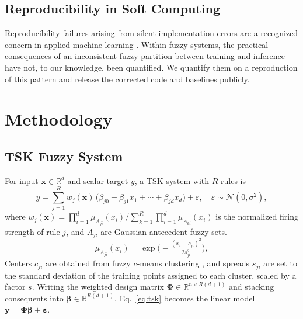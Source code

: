 \documentclass[review,1p,times]{elsarticle}
\begin{document}
\subsection{Reproducibility in Soft Computing}

Reproducibility failures arising from silent implementation errors are a recognized concern in applied machine learning \cite{pineau2021improving}. Within fuzzy systems, the practical consequences of an inconsistent fuzzy partition between training and inference have not, to our knowledge, been quantified. We quantify them on a reproduction of this pattern and release the corrected code and baselines publicly.

\section{Methodology}
\label{sec:method}

\subsection{TSK Fuzzy System}
\label{sec:tsk}

For input $\mathbf{x}\in\mathbb{R}^d$ and scalar target $y$, a TSK system with $R$ rules is
\begin{equation}
 y = \sum_{j=1}^{R} w_j(\mathbf{x})\,\big(\beta_{j0}+\beta_{j1}x_1+\cdots+\beta_{jd}x_d\big) + \varepsilon,\quad
 \varepsilon\sim\mathcal{N}(0,\sigma^2),
 \label{eq:tsk}
\end{equation}
where $w_j(\mathbf{x})=\prod_{i=1}^{d}\mu_{A_{ji}}(x_i)\big/\sum_{k=1}^{R}\prod_{i=1}^{d}\mu_{A_{ki}}(x_i)$ is the normalized firing strength of rule $j$, and $A_{ji}$ are Gaussian antecedent fuzzy sets.
\begin{equation}
 \mu_{A_{ji}}(x_i)=\exp\!\Big(-\tfrac{(x_i-c_{ji})^2}{2 s_{ji}^2}\Big),
 \label{eq:membership}
\end{equation}
Centers $c_{ji}$ are obtained from fuzzy $c$-means clustering \cite{bezdek1984fcm}, and spreads $s_{ji}$ are set to the standard deviation of the training points assigned to each cluster, scaled by a factor $s$. Writing the weighted design matrix $\boldsymbol{\Phi}\in\mathbb{R}^{n\times R(d+1)}$ and stacking consequents into $\boldsymbol{\beta}\in\mathbb{R}^{R(d+1)}$, Eq.~\eqref{eq:tsk} becomes the linear model $\mathbf{y}=\boldsymbol{\Phi}\boldsymbol{\beta}+\boldsymbol{\varepsilon}$.
\end{document}
